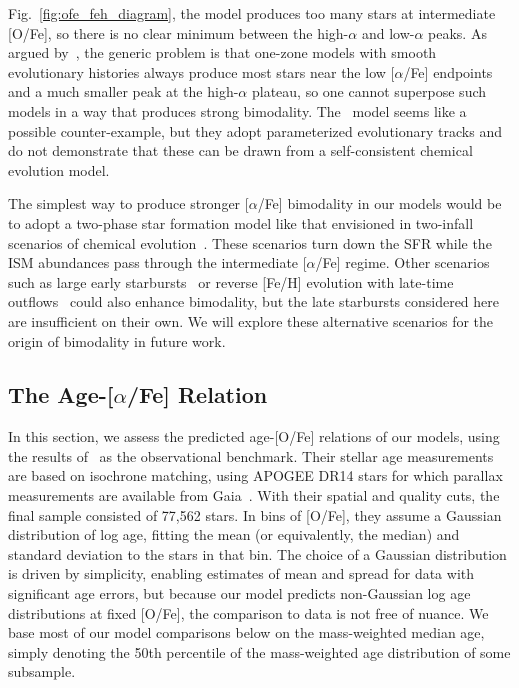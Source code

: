 \documentclass[draft2.tex]{subfiles}
\begin{document}
Fig.~\ref{fig:ofe_feh_diagram}, the model produces too many stars at 
intermediate [O/Fe], so there is no clear minimum between the high-$\alpha$ 
and low-$\alpha$ peaks. 
As argued by~\citet{Vincenzo2021a}, the generic problem is that one-zone models 
with smooth evolutionary histories always produce most stars near the low 
[$\alpha$/Fe] endpoints and a much smaller peak at the high-$\alpha$ 
plateau, so one cannot superpose such models in a way that produces strong 
bimodality. 
The~\citet{Sharma2020} model seems like a possible counter-example, but they 
adopt parameterized evolutionary tracks and do not demonstrate that these can 
be drawn from a self-consistent chemical evolution model. 
\par 
The simplest way to produce stronger [$\alpha$/Fe] bimodality in our models 
would be to adopt a two-phase star formation model like that envisioned in 
two-infall scenarios of chemical evolution~\citep[e.g.][]{Chiappini1997, 
Chiappini2001, Romano2010, Grisoni2017, Noguchi2018, Palla2020, Spitoni2016, 
Spitoni2018, Spitoni2019a, Spitoni2020, Spitoni2021}. 
These scenarios turn down the SFR while the ISM abundances pass through the 
intermediate [$\alpha$/Fe] regime. 
Other scenarios such as large early starbursts~\citep{Clarke2019} or reverse 
[Fe/H] evolution with late-time outflows~\citep{Weinberg2017} could also 
enhance bimodality, but the late starbursts considered here are insufficient 
on their own. 
We will explore these alternative scenarios for the origin of bimodality in 
future work. 

\subsection{The Age-[$\alpha$/Fe] Relation} 
\label{sec:obs_comp:age_alpha} 
In this section, we assess the predicted age-[O/Fe] relations of our models, 
using the results of~\citet{Feuillet2019} as the observational benchmark. 
Their stellar age measurements are based on isochrone matching, 
using APOGEE DR14 stars for which parallax measurements are available 
from Gaia~\citep{Abolfathi2014, GaiaDR2}. 
With their spatial and quality cuts, the final sample consisted of 77,562 
stars. 
In bins of [O/Fe], they assume a Gaussian distribution of log age, fitting the 
mean (or equivalently, the median) and standard deviation to the stars in that 
bin. 
The choice of a Gaussian distribution is driven by simplicity, enabling 
estimates of mean and spread for data with significant age errors, but because 
our model predicts non-Gaussian log age distributions at fixed [O/Fe], the 
comparison to data is not free of nuance. 
We base most of our model comparisons below on the mass-weighted median age, 
simply denoting the 50th percentile of the mass-weighted age distribution of 
some subsample. 
\par 
\end{document}
